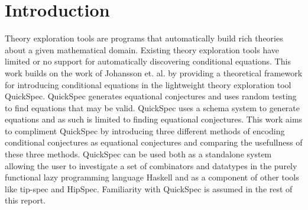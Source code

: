 \section{Introduction}
Theory exploration tools are programs that
automatically build rich theories about a given mathematical
domain. %
Existing theory exploration tools have limited or no
support for automatically discovering conditional equations.
This work builds on the work of Johansson et. al. %
by providing a theoretical framework for introducing conditional
equations in the lightweight theory exploration tool QuickSpec. %
QuickSpec generates equational conjectures and uses random testing to
find equations that may be valid. QuickSpec uses a schema system to
generate equations and as such is limited to finding equational conjectures.
This work aims to compliment QuickSpec by introducing three different methods
of encoding conditional conjectures as equational conjectures and comparing
the usefullness of these three methods. QuickSpec can be used both as a standalone
system allowing the user to investigate a set of combinators and datatypes in the
purely functional lazy programming language Haskell and as a component of other tools %
like tip-spec and HipSpec. %
Familiarity with QuickSpec is assumed in the rest of this report.
